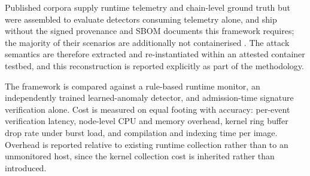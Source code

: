 \documentclass[conference]{IEEEtran}
\begin{document}
Published corpora supply runtime telemetry and chain-level ground truth
but were assembled to evaluate detectors consuming telemetry alone, and
ship without the signed provenance and SBOM documents this framework
requires; the majority of their scenarios are additionally not
containerised \cite{synthchain2026}. The attack semantics are therefore
extracted and re-instantiated within an attested container testbed, and
this reconstruction is reported explicitly as part of the methodology.

The framework is compared against a rule-based runtime monitor, an
independently trained learned-anomaly detector, and admission-time
signature verification alone. Cost is measured on equal footing with
accuracy: per-event verification latency, node-level CPU and memory
overhead, kernel ring buffer drop rate under burst load, and compilation
and indexing time per image. Overhead is reported relative to existing
runtime collection rather than to an unmonitored host, since the kernel
collection cost is inherited rather than introduced.
\end{document}
